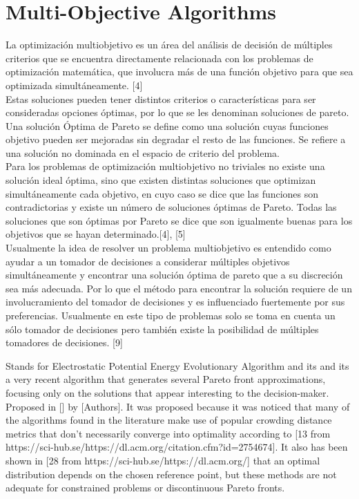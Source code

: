 \section{Multi-Objective Algorithms}

La optimización multiobjetivo es un área del análisis de decisión de múltiples criterios que se encuentra directamente relacionada con los problemas de optimización matemática, que involucra más de una función objetivo para que sea optimizada simultáneamente. [4] \\

Estas soluciones pueden tener distintos criterios o características para ser consideradas opciones óptimas, por lo que se les denominan soluciones de pareto. Una solución Óptima de Pareto se define como una solución cuyas funciones objetivo pueden ser mejoradas sin degradar el resto de las funciones. Se refiere a una solución no dominada en el espacio de criterio del problema. \\

Para los problemas de optimización multiobjetivo no triviales no existe una solución ideal óptima, sino que existen distintas soluciones que optimizan simultáneamente cada objetivo, en cuyo caso se dice que las funciones son contradictorias y existe un número de soluciones óptimas de Pareto. Todas las soluciones que son óptimas por Pareto se dice que son igualmente buenas para los objetivos que se hayan determinado.[4], [5] \\

Usualmente la idea de resolver un problema multiobjetivo es entendido como ayudar a un tomador de decisiones a considerar múltiples objetivos simultáneamente y encontrar una solución óptima de pareto que a su discreción sea más adecuada. Por lo que el método para encontrar la solución requiere de un involucramiento del tomador de decisiones y es influenciado fuertemente por sus preferencias. Usualmente en este tipo de problemas solo se toma en cuenta un sólo tomador de decisiones pero también existe la posibilidad de múltiples tomadores de decisiones. [9]

Stands for Electrostatic Potential Energy Evolutionary Algorithm and its and its a very recent algorithm that generates several Pareto front approximations, focusing only on the solutions that appear interesting to the decision-maker. Proposed in []
by [Authors]. It was proposed because it was noticed that many of the algorithms found in the literature make use of popular crowding distance metrics that don't necessarily converge into optimality according to [13 from https://sci-hub.se/https://dl.acm.org/citation.cfm?id=2754674]. It also has been shown in [28 from https://sci-hub.se/https://dl.acm.org/] that an optimal distribution depends on the chosen reference point, but these methods are not adequate for constrained problems or discontinuous Pareto fronts.\\

